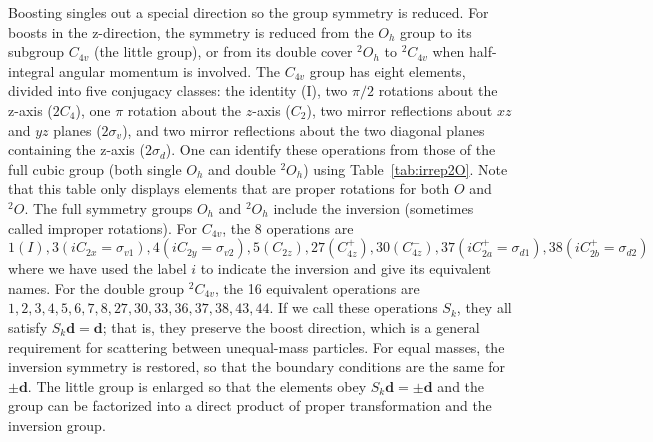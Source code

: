 \documentclass[aps,prd,reprint,showpacs,floatfix,longbibliography,,superscriptaddress]{revtex4-1}
\begin{document}
\begin{widetext}
Boosting singles out a special direction so the group symmetry is reduced. For boosts in the z-direction, the symmetry is reduced from the $O_h$ group to 
its subgroup $C_{4v}$ (the little group), or from its double cover $^2O_h$ to $^2C_{4v}$ when half-integral angular momentum is involved. 
The $C_{4v}$ group has eight elements, divided into five conjugacy classes: 
the identity (I), two $\pi/2$ rotations about the z-axis ($2 C_4$), 
one $\pi$ rotation about the $z$-axis ($C_2$),  two mirror reflections about $xz$ and $yz$ planes ($2\sigma_v$), 
and two mirror reflections about the two diagonal planes containing the z-axis  ($2\sigma_d$). 
One can identify these operations from those of the full cubic group (both single $O_h$ and double $^2O_h$) using Table~\ref{tab:irrep2O}. 
Note that this table only displays elements that are proper rotations for both $O$ and $^2O$. 
The full symmetry groups $O_h$ and $^2O_h$ include the inversion (sometimes called improper rotations).
For $C_{4v}$, the 8 operations are  $1(I), 3 (iC_{2x}=\sigma_{v1}), 4 (iC_{2y}=\sigma_{v2}), 5 (C_{2z}), 27 (C^+_{4z}), 30 (C^-_{4z}), 37 (iC^+_{2a}=\sigma_{d1}), 38 (iC^+_{2b}=\sigma_{d2})$ 
where we have used the label $i$ to indicate the inversion and give its equivalent names.
For the double group $^2C_{4v}$, the 16 equivalent operations are  $1,2,3,4,5,6,7,8,27,30,33,36,37,38,43,44$. 
If we call these operations $S_k$, they all satisfy $S_k \bm d = \bm d$; that is, they preserve the boost direction, which is a general requirement for 
scattering between unequal-mass particles. 
For equal masses, the inversion symmetry is restored,
so that the boundary conditions are the same for $\pm\bm d$. The little group is enlarged so
that the elements obey $S_k \bm d =\pm \bm d$ and the group can be factorized into a direct product
of proper transformation and the inversion group.


\end{widetext}
\end{document}
